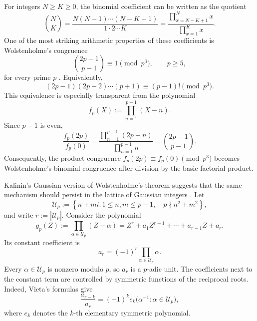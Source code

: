 \documentclass[a4paper,american,11pt]{amsart}
\numberwithin{equation}{section}
\theoremstyle{definition}
\begin{document}
For integers $N\geq K\geq 0$, the binomial coefficient can be written as the quotient
\begin{equation}\label{eq:ordinary-binomial-product}
\binom{N}{K}
=
\frac{N(N-1)\cdots(N-K+1)}{1\cdot2\cdots K}
=
\frac{\displaystyle\prod_{x=N-K+1}^{N}x}
{\displaystyle\prod_{x=1}^{K}x}.
\end{equation}
One of the most striking arithmetic properties of these coefficients is Wolstenholme's congruence
\begin{equation}\label{eq:wolstenholme-classical}
\binom{2p-1}{p-1}\equiv 1\pmod{p^3},
\qquad p\geq5,
\end{equation}
for every prime $p$ \cite{Wolstenholme1862}. Equivalently,
\begin{equation}\label{eq:wolstenholme-product}
(2p-1)(2p-2)\cdots(p+1)
\equiv
(p-1)!
\pmod{p^3}.
\end{equation}
This equivalence is especially transparent from the polynomial
\[
f_p(X):=\prod_{n=1}^{p-1}(X-n).
\]
Since $p-1$ is even,
\begin{equation}\label{eq:wolstenholme-polynomial-quotient}
\frac{f_p(2p)}{f_p(0)}
=
\frac{\displaystyle\prod_{n=1}^{p-1}(2p-n)}
{\displaystyle\prod_{n=1}^{p-1}n}
=
\binom{2p-1}{p-1}.
\end{equation}
Consequently, the product congruence $f_p(2p)\equiv f_p(0)\pmod{p^3}$ becomes Wolstenholme's binomial congruence after division by the basic factorial product.

Kalinin's Gaussian version of Wolstenholme's theorem suggests that the same mechanism should persist in the lattice of Gaussian integers \cite{Kalinin2025,KalininZottor2026Gaussian}. Let
\begin{equation}\label{eq:admissible-gaussian-block}
\mathcal U_p
:=
\left\{
 n+mi:
 1\leq n,m\leq p-1,
 \quad p\nmid n^2+m^2
\right\},
\end{equation}
and write $r:=|\mathcal U_p|$. Consider the polynomial
\begin{equation}\label{eq:gaussian-root-polynomial}
g_p(Z)
:=
\prod_{\alpha\in\mathcal U_p}(Z-\alpha)
=
Z^r+a_1Z^{r-1}+\cdots+a_{r-1}Z+a_r.
\end{equation}
Its constant coefficient is
\[
a_r=(-1)^r\prod_{\alpha\in\mathcal U_p}\alpha.
\]
Every $\alpha\in\mathcal U_p$ is nonzero modulo $p$, so $a_r$ is a $p$-adic unit. The coefficients next to the constant term are controlled by symmetric functions of the reciprocal roots. Indeed, Vieta's formulas give
\begin{equation}\label{eq:vieta-reciprocals}
\frac{a_{r-k}}{a_r}
=
(-1)^k e_k\bigl(\alpha^{-1}:\alpha\in\mathcal U_p\bigr),
\end{equation}
where $e_k$ denotes the $k$-th elementary symmetric polynomial.
\end{document}
